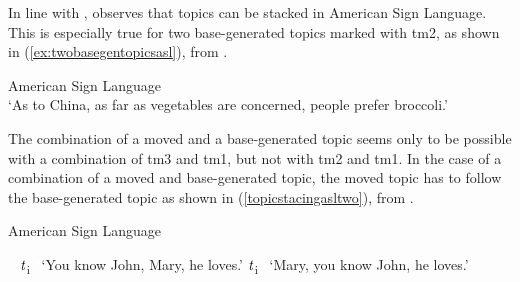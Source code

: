 In line with \citet{rizzi1997fine}, \citet{aarons1996topics} observes that topics can be stacked in American Sign Language. This is especially true for two base-generated topics marked with tm2, as shown in (\ref{ex:twobasegentopicsasl}), from \citet[90]{aarons1996topics}.

\begin{exe}
\ex American Sign Language  \\   
\glt `As to China, as far as vegetables are concerned, people prefer broccoli.' \label{ex:twobasegentopicsasl} 
\end{exe} 

\noindent The combination of a moved and a base-generated topic seems only to be possible with a combination of tm3 and tm1, but not with tm2 and tm1. In the case of a combination of a moved and base-generated topic, the moved topic has to follow the base-generated topic as shown in (\ref{topicstacingasltwo}), from \citet[94]{aarons1996topics}.

\begin{exe}
\ex American Sign Language \label{topicstacingasltwo}\begin{xlist} 
\ex \textcolor{white}{*}   $\textrm{\textit{t}}$\textsubscript{i}
\glt \textcolor{white}{*}`You know John, Mary, he loves.' \label{ex:topicstacingasltwoa}
\ex *   {$\textrm{\textit{t}}$\textsubscript{i}}
\glt \textcolor{white}{*}`Mary, you know John, he loves.' \label{ex:topicstacingasltwoa}
\end{xlist}
\end{exe} 

